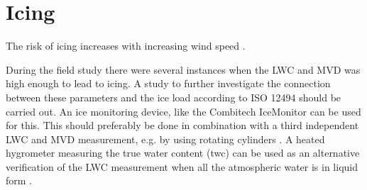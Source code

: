 \section{Icing}

The risk of icing increases with increasing wind speed \cite{makk2000}.

During the field study there were several instances when the LWC and MVD was high enough to lead to icing. A study to further investigate the connection between these parameters and the ice load according to ISO 12494 \cite{makk2014} should be carried out. An ice monitoring device, like the Combitech IceMonitor \cite{cost727,thors2015} can be used for this. This should preferably be done in combination with a third independent LWC and MVD measurement, e.g. by using rotating cylinders \cite{makk1992,knez2005}. A heated hygrometer measuring the true water content (\gls{twc}) can be used as an alternative verification of the LWC measurement when all the atmospheric water is in liquid form \cite{spie2012}.






